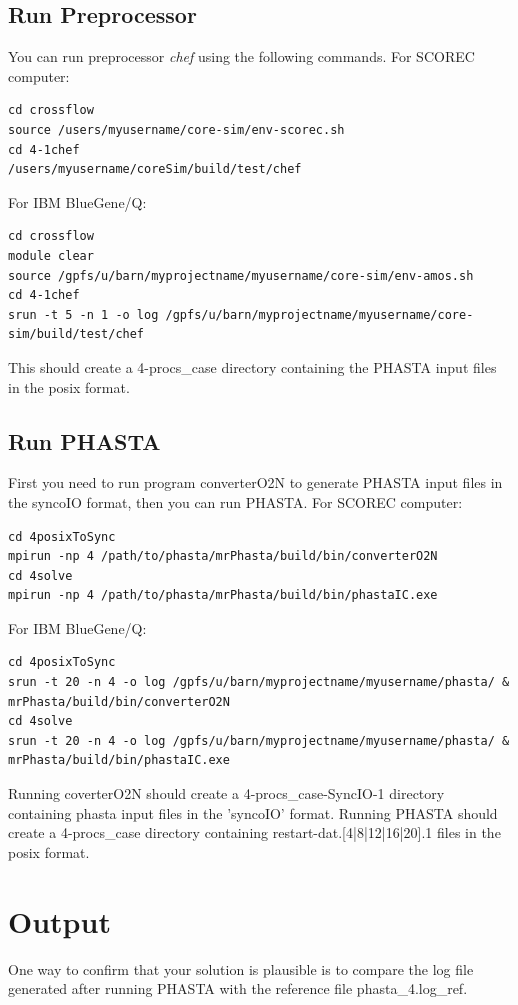 \documentclass{article}
\begin{document}
\subsection{Run Preprocessor}
You can run preprocessor \textit{chef} using the following commands. For SCOREC computer:
\begin{lstlisting}
cd crossflow
source /users/myusername/core-sim/env-scorec.sh
cd 4-1chef
/users/myusername/coreSim/build/test/chef 
\end{lstlisting}
For IBM BlueGene/Q:
\begin{lstlisting}
cd crossflow
module clear
source /gpfs/u/barn/myprojectname/myusername/core-sim/env-amos.sh
cd 4-1chef
srun -t 5 -n 1 -o log /gpfs/u/barn/myprojectname/myusername/core-sim/build/test/chef
\end{lstlisting}

This should create a 4-procs\_case directory containing the PHASTA input files in the posix format.

\subsection{Run PHASTA}

First you need to run program converterO2N to generate PHASTA input files in the syncoIO format, then you can run PHASTA. For SCOREC computer: 
\begin{lstlisting}
cd 4posixToSync
mpirun -np 4 /path/to/phasta/mrPhasta/build/bin/converterO2N 
cd 4solve
mpirun -np 4 /path/to/phasta/mrPhasta/build/bin/phastaIC.exe 
\end{lstlisting}
For IBM BlueGene/Q:
\begin{lstlisting}
cd 4posixToSync
srun -t 20 -n 4 -o log /gpfs/u/barn/myprojectname/myusername/phasta/ & 
mrPhasta/build/bin/converterO2N
cd 4solve
srun -t 20 -n 4 -o log /gpfs/u/barn/myprojectname/myusername/phasta/ &
mrPhasta/build/bin/phastaIC.exe
\end{lstlisting}
Running coverterO2N should create a 4-procs\_case-SyncIO-1 directory containing phasta input files in the 'syncoIO' format.
Running PHASTA should create a 4-procs\_case directory containing restart-dat.[4|8|12|16|20].1 files in the posix format.

\section{Output}

One way to confirm that your solution is plausible is to compare the log file generated after running PHASTA with the reference file phasta\_4.log\_ref.
\end{document}
